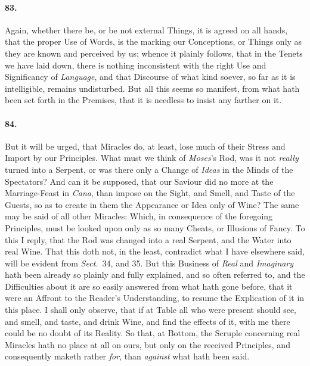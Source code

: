 \documentclass[]{article}
\newenvironment{sectionbody}{\begin{multicols}{2}}{\end{multicols}}
\begin{document}
\begin{sectionbody}
\paragraph{83.} Again, whether there be, or be not external Things, it is agreed
on all hands, that the proper Use of Words, is the marking our
Conceptions, or Things only as they are known and perceived by
us; whence it plainly follows, that in the Tenets we have laid
down, there is nothing inconsistent with the right Use and
Significancy of \emph{Language}, and that Discourse of what
kind soever, so far as it is intelligible, remains undisturbed.
But all this seems so manifest, from what hath been set forth in
the Premises, that it is needless to insist any farther on it.



\paragraph{84.} But it will be urged, that Miracles do, at least, lose much of
their Stress and Import by our Principles.  What must we think of
\emph{Moses}'s Rod, was it not \emph{really} turned into a
Serpent, or was there only a Change of \emph{Ideas} in the
Minds of the Spectators?  And can it be supposed, that our
Saviour did no more at the Marriage-Feast in \emph{Cana}, than
impose on the Sight, and Smell, and Taste of the Guests, so as to
create in them the Appearance or Idea only of Wine? The same may
be said of all other Miracles: Which, in consequence of the
foregoing Principles, must be looked upon only as so many Cheats,
or Illusions of Fancy.  To this I reply, that the Rod was changed
into a real Serpent, and the Water into real Wine.  That this
doth not, in the least, contradict what I have elsewhere said,
will be evident from \emph{Sect.}\ 34, and 35.
But this Business of \emph{Real} and \emph{Imaginary} hath
been already so plainly and fully explained, and so often
referred to, and the Difficulties about it are so easily answered
from what hath gone before, that it were an Affront to the
Reader's Understanding, to resume the Explication of it in this
place.  I shall only observe, that if at Table all who were
present should see, and smell, and taste, and drink Wine, and
find the effects of it, with me there could be no doubt of its
Reality.  So that, at Bottom, the Scruple concerning real
Miracles hath no place at all on ours, but only on the received
Principles, and consequently maketh rather \emph{for}, than
\emph{against} what hath been said.




\end{sectionbody}
\end{document}
